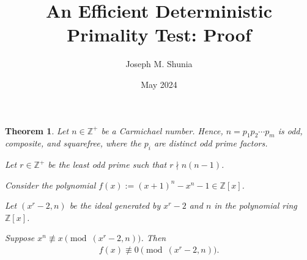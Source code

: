 \documentclass{article}
\title{An Efficient Deterministic Primality Test: Proof}
\author{Joseph M. Shunia}
\date{May 2024}
\theoremstyle{plain}
\newtheorem{theorem}{Theorem}
\theoremstyle{definition}
\begin{document}
\maketitle

\begin{theorem}
Let $n \in \mathbb{Z}^+$ be a Carmichael number. Hence, $n = p_1 p_2 \cdots p_m$ is odd, composite, and squarefree, where the $p_i$ are distinct odd prime factors.

Let $r \in \mathbb{Z}^+$ be the least odd prime such that $r \nmid n (n-1)$.

Consider the polynomial $f(x) := (x+1)^n - x^n - 1 \in \mathbb{Z}[x]$.

Let $(x^r-2, n)$ be the ideal generated by $x^r-2$ and $n$ in the polynomial ring $\mathbb{Z}[x]$.

Suppose $x^n \not\equiv x \pmod{(x^r-2,n)}$. Then
\begin{align*}
f(x) \not\equiv 0 \pmod{(x^r-2, n)}.
\end{align*}
\end{theorem}
\end{document}
